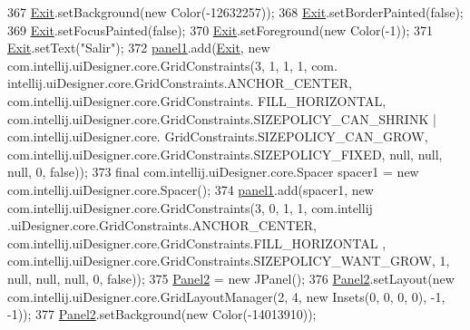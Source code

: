 \begin{DoxyCode}
367         \hyperlink{classpresentacion_1_1form_1_1mainForm_a721fa95a4d72e8f68875fcc0003e041f}{Exit}.setBackground(\textcolor{keyword}{new} Color(-12632257));
368         \hyperlink{classpresentacion_1_1form_1_1mainForm_a721fa95a4d72e8f68875fcc0003e041f}{Exit}.setBorderPainted(\textcolor{keyword}{false});
369         \hyperlink{classpresentacion_1_1form_1_1mainForm_a721fa95a4d72e8f68875fcc0003e041f}{Exit}.setFocusPainted(\textcolor{keyword}{false});
370         \hyperlink{classpresentacion_1_1form_1_1mainForm_a721fa95a4d72e8f68875fcc0003e041f}{Exit}.setForeground(\textcolor{keyword}{new} Color(-1));
371         \hyperlink{classpresentacion_1_1form_1_1mainForm_a721fa95a4d72e8f68875fcc0003e041f}{Exit}.setText(\textcolor{stringliteral}{"Salir"});
372         \hyperlink{classpresentacion_1_1form_1_1mainForm_aa43e009cc6dc09d4e637385fbd361510}{panel1}.add(\hyperlink{classpresentacion_1_1form_1_1mainForm_a721fa95a4d72e8f68875fcc0003e041f}{Exit}, \textcolor{keyword}{new} com.intellij.uiDesigner.core.GridConstraints(3, 1, 1, 1, com.
      intellij.uiDesigner.core.GridConstraints.ANCHOR\_CENTER, com.intellij.uiDesigner.core.GridConstraints.
      FILL\_HORIZONTAL, com.intellij.uiDesigner.core.GridConstraints.SIZEPOLICY\_CAN\_SHRINK | com.intellij.uiDesigner.core.
      GridConstraints.SIZEPOLICY\_CAN\_GROW, com.intellij.uiDesigner.core.GridConstraints.SIZEPOLICY\_FIXED, null, null, 
      null, 0, \textcolor{keyword}{false}));
373         \textcolor{keyword}{final} com.intellij.uiDesigner.core.Spacer spacer1 = \textcolor{keyword}{new} com.intellij.uiDesigner.core.Spacer();
374         \hyperlink{classpresentacion_1_1form_1_1mainForm_aa43e009cc6dc09d4e637385fbd361510}{panel1}.add(spacer1, \textcolor{keyword}{new} com.intellij.uiDesigner.core.GridConstraints(3, 0, 1, 1, com.intellij
      .uiDesigner.core.GridConstraints.ANCHOR\_CENTER, com.intellij.uiDesigner.core.GridConstraints.FILL\_HORIZONTAL
      , com.intellij.uiDesigner.core.GridConstraints.SIZEPOLICY\_WANT\_GROW, 1, null, null, null, 0, \textcolor{keyword}{false}));
375         \hyperlink{classpresentacion_1_1form_1_1mainForm_a40e87b5e341114287b070012a4aadc8f}{Panel2} = \textcolor{keyword}{new} JPanel();
376         \hyperlink{classpresentacion_1_1form_1_1mainForm_a40e87b5e341114287b070012a4aadc8f}{Panel2}.setLayout(\textcolor{keyword}{new} com.intellij.uiDesigner.core.GridLayoutManager(2, 4, \textcolor{keyword}{new} Insets(0, 0, 0,
       0), -1, -1));
377         \hyperlink{classpresentacion_1_1form_1_1mainForm_a40e87b5e341114287b070012a4aadc8f}{Panel2}.setBackground(\textcolor{keyword}{new} Color(-14013910));

\end{DoxyCode}
